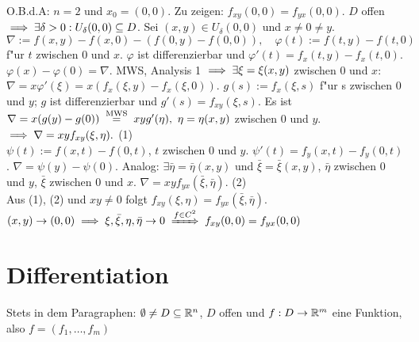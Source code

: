 \documentclass[a4paper,twoside,DIV15,BCOR12mm,chapterprefix=true,headings=twolinechapter]{scrbook}
\begin{document}
\begin{beweis}
O.B.d.A: $n=2$ und $x_0=(0,0)$. Zu zeigen: $f_{xy}(0,0)=f_{yx}(0,0)$. $D$ offen $\implies\exists\delta>0: U_\delta(0,0)\subseteq D$. Sei $(x,y) \in U_\delta(0,0)$ und $x\ne 0\ne y$. $$\nabla:=f(x,y)-f(x,0)-(f(0,y)-f(0,0)),\quad\varphi(t):=f(t,y)-f(t,0)$$ f"ur $t$ zwischen $0$ und $x$. $\varphi$ ist differenzierbar und $\varphi'(t)=f_x(t,y)-f_x(t,0)$. $\varphi(x)-\varphi(0)=\nabla$. MWS, Analysis 1 $\implies\exists\xi=\xi(x,y)$ zwischen $0$ und $x$: $\nabla=x\varphi'(\xi)=x(f_x(\xi,y)-f_x(\xi,0))$. $g(s):=f_x(\xi,s)$ f"ur s zwischen $0$ und $y$; $g$ ist differenzierbar und $g'(s)=f_{xy}(\xi,s)$. Es ist $\nabla=x(g(y)-g(0))\gleichnach{MWS}xyg'(\eta),\ \eta=\eta(x,y)$ zwischen $0$ und $y$. $\implies \nabla=xyf_{xy}(\xi,\eta).$ (1)\\
$\psi(t):=f(x,t)-f(0,t)$, $t$ zwischen $0$ und $y$. $\psi'(t)=f_y(x,t)-f_y(0,t)$. $\nabla=\psi(y)-\psi(0)$. Analog: $\exists \bar\eta=\bar\eta(x,y)$ und $\bar\xi=\bar\xi(x,y)$, $\bar\eta$ zwischen $0$ und $y$, $\bar\xi$ zwischen $0$ und $x$. $\nabla=xyf_{yx}(\bar\xi,\bar\eta).$ (2)\\
Aus (1), (2) und $xy\ne0$ folgt $f_{xy}(\xi,\eta)=f_{yx}(\bar\xi,\bar\eta)$. $(x,y)\to(0,0)\folgt\xi,\bar\xi,\eta,\bar\eta\to 0\folgtwegen{f\in C^2}f_{xy}(0,0)=f_{yx}(0,0)$
\end{beweis}

\chapter{Differentiation}
\def\grad{\mathop{\rm grad}\nolimits}

\begin{vereinbarung}
Stets in dem Paragraphen: $\emptyset\ne D\subseteq\mathbb{R}^n$, $D$ offen und $f:D\to\mathbb{R}^m$ eine Funktion, also $f=(f_1,\ldots,f_m)$
\end{vereinbarung}
\end{document}
